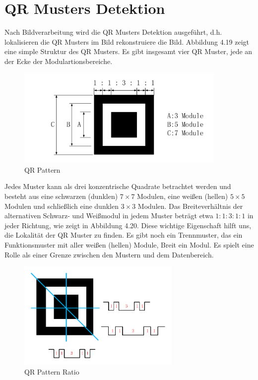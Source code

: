 \section{QR Musters Detektion} 

Nach Bildverarbeitung wird die QR Musters Detektion ausgeführt, d.h. lokalisieren die QR Musters im Bild rekonstruiere die Bild. Abbildung 4.19 zeigt eine simple Struktur des QR Musters. Es gibt insgesamt vier QR Muster, jede an der Ecke der Modulartionsbereiche. 

\begin{figure}[H]
 \centering 
 \includegraphics[keepaspectratio,width=0.9\textwidth]{images/4_ZweiteErfahrung/QRMuster/QRPattern.pdf}
 \caption{QR Pattern}
 \label{fig:QRPattern}
\end{figure}

Jedes Muster kann als drei konzentrische Quadrate betrachtet werden und besteht aus eine schwarzen (dunklen) $7 \times 7$ Modulen, eine weißen (hellen) $5 \times 5$ Modulen und schließlich eine dunklen $3 \times 3$ Modulen. Das Breiteverhältnis der alternativen Schwarz- und Weißmodul in jedem Muster beträgt etwa $1:1:3:1:1$ in jeder Richtung, wie zeigt in Abbildung 4.20. Diese wichtige Eigenschaft hilft uns, die Lokalität der QR Muster zu finden. Es gibt noch ein Trennmuster, das ein Funktionsmuster mit aller weißen (hellen) Module, Breit ein Modul. Es spielt eine Rolle als einer Grenze zwischen den Mustern und dem Datenbereich.
 
 \begin{figure}[H]
 \centering 
 \includegraphics[keepaspectratio,width=0.7\textwidth]{images/4_ZweiteErfahrung/QRMuster/QP_Patternratio.pdf}
 \caption{QR Pattern Ratio}
 \label{fig:QRPatternRatio}
\end{figure}


